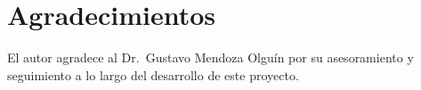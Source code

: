 \documentclass[conference]{IEEEtran}
\begin{document}
\section*{Agradecimientos}

El autor agradece al Dr.\ Gustavo Mendoza Olguín por su asesoramiento y seguimiento
a lo largo del desarrollo de este proyecto.



\end{document}
